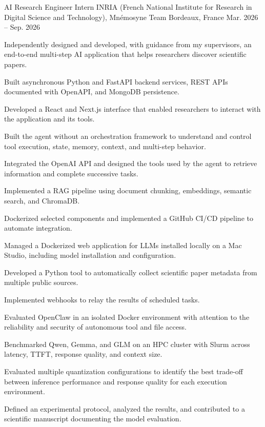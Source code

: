 
\begin{cventries}
  \cventry
    {AI Research Engineer Intern}
    {INRIA (French National Institute for Research in Digital Science and Technology), Mnémosyne Team}
    {Bordeaux, France}
    {Mar. 2026 -- Sep. 2026}
    {
      \begin{cvitems}
        \item {Independently designed and developed, with guidance from my supervisors, an end-to-end multi-step AI application that helps researchers discover scientific papers.}
        \item {Built asynchronous Python and FastAPI backend services, REST APIs documented with OpenAPI, and MongoDB persistence.}
        \item {Developed a React and Next.js interface that enabled researchers to interact with the application and its tools.}
        \item {Built the agent without an orchestration framework to understand and control tool execution, state, memory, context, and multi-step behavior.}
        \item {Integrated the OpenAI API and designed the tools used by the agent to retrieve information and complete successive tasks.}
        \item {Implemented a RAG pipeline using document chunking, embeddings, semantic search, and ChromaDB.}
        \item {Dockerized selected components and implemented a GitHub CI/CD pipeline to automate integration.}
        \item {Managed a Dockerized web application for LLMs installed locally on a Mac Studio, including model installation and configuration.}
        \item {Developed a Python tool to automatically collect scientific paper metadata from multiple public sources.}
        \item {Implemented webhooks to relay the results of scheduled tasks.}
        \item {Evaluated OpenClaw in an isolated Docker environment with attention to the reliability and security of autonomous tool and file access.}
        \item {Benchmarked Qwen, Gemma, and GLM on an HPC cluster with Slurm across latency, TTFT, response quality, and context size.}
        \item {Evaluated multiple quantization configurations to identify the best trade-off between inference performance and response quality for each execution environment.}
        \item {Defined an experimental protocol, analyzed the results, and contributed to a scientific manuscript documenting the model evaluation.}
      \end{cvitems}
    }


\end{cventries}
